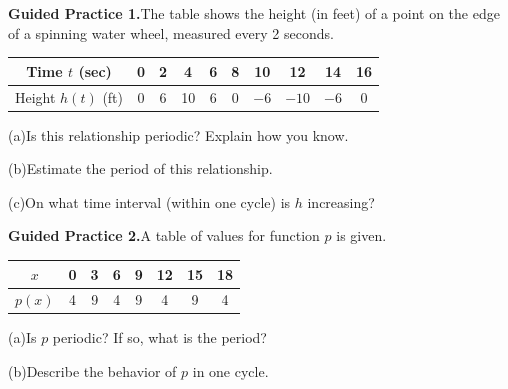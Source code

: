 \documentclass[10pt]{article}
\begin{document}
\vspace{0.08in}

\begin{practicebox}

\textbf{Guided Practice 1.}\quad The table shows the height (in feet) of a
point on the edge of a spinning water wheel, measured every 2 seconds.

\vspace{4pt}
\begin{center}
\renewcommand{\arraystretch}{1.35}
\begin{tabular}{|c|c|c|c|c|c|c|c|c|c|}
\hline
Time $t$ (sec) & 0 & 2 & 4 & 6 & 8 & 10 & 12 & 14 & 16 \\
\hline
Height $h(t)$ (ft) & 0 & 6 & 10 & 6 & 0 & $-6$ & $-10$ & $-6$ & 0 \\
\hline
\end{tabular}
\end{center}

\vspace{4pt}
(a)\quad Is this relationship periodic? Explain how you know.

(b)\quad Estimate the period of this relationship. \writeline

(c)\quad On what time interval (within one cycle) is $h$ increasing?
\writeline

\vspace{0.10in}
\textbf{Guided Practice 2.}\quad A table of values for function $p$ is given.

\begin{center}
\renewcommand{\arraystretch}{1.35}
\begin{tabular}{|c|c|c|c|c|c|c|c|}
\hline
$x$ & 0 & 3 & 6 & 9 & 12 & 15 & 18 \\
\hline
$p(x)$ & 4 & 9 & 4 & 9 & 4 & 9 & 4 \\
\hline
\end{tabular}
\end{center}

(a)\quad Is $p$ periodic? If so, what is the period?
\writeline

(b)\quad Describe the behavior of $p$ in one cycle.

\end{practicebox}
\end{document}
